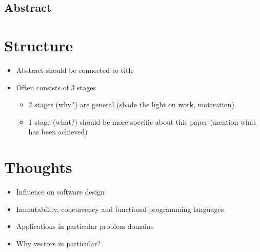 \vspace*{2cm}
\thispagestyle{plain}

\begin{center}

{}

\section*{Abstract}

\end{center}


\section*{Structure}
\begin{itemize}
    \item Abstract should be connected to title
    \item Often consists of 3 stages
    \begin{itemize}
        \item 2 stages (why?) are general (shade the light on work, motivation)
        \item 1 stage (what?) should be more specific about this paper (mention what has been achieved)
    \end{itemize}
\end{itemize}

\section*{Thoughts}
\begin{itemize}
    \item Influence on software design
    \item Immutability, concurrency and functional programming languages
    \item Applications in particular problem domains
    \item Why vectors in particular?
\end{itemize}
